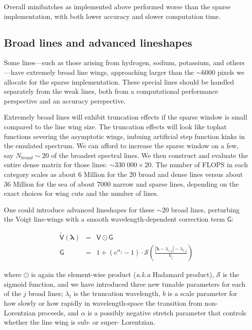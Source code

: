 \documentclass[twocolumn]{aastex631}
\begin{document}
Overall minibatches as implemented above performed worse than the sparse implementation, with both lower accuracy and slower computation time.

\subsection{Broad lines and advanced lineshapes}

Some lines---such as those arising from hydrogen, sodium, potassium, and others---have extremely broad line wings, approaching larger than the $\sim6000$ pixels we allocate for the sparse implementation. These special lines should be handled separately from the weak lines, both from a computational performance perspective and an accuracy perspective.

Extremely broad lines will exhibit truncation effects if the sparse window is small compared to the line wing size. The truncation effects will look like tophat functions severing the asymptotic wings, imbuing artificial step function kinks in the emulated spectrum. We can afford to increase the sparse window on a few, say $N_{broad}\sim20$ of the broadest spectral lines. We then construct and evaluate the entire dense matrix for those lines: $\sim 330\;000 \times 20$. The number of FLOPS in each category scales as about 6 Million for the 20 broad and dense lines versus about 36 Million for the sea of about 7000 narrow and sparse lines, depending on the exact choices for wing cuts and the number of lines.

One could introduce advanced lineshapes for these $\sim20$ broad lines, perturbing the Voigt line-wings with a smooth wavelength-dependent correction term $\mathsf{G}$:

\begin{eqnarray}
    \mathsf{\tilde{V}(\bm{\lambda})} &=& \mathsf{V} \odot \mathsf{G}\\
    \mathsf{G} &=& 1 + (e^{\alpha_j} - 1) \cdot \mathcal{S}\left(\frac{|\bm{\lambda}-\lambda_{c,j}| - \lambda_{t, j}}{b_j}\right)
\end{eqnarray}

where $\odot$ is again the element-wise product (\emph{a.k.a} Hadamard product), $\mathcal{S}$ is the sigmoid function, and we have introduced three new tunable parameters for each of the $j$ broad lines; $\lambda_t$ is the truncation wavelength, $b$ is a scale parameter for how slowly or how rapidly in wavelength-space the transition from non-Lorentzian proceeds, and $\alpha$ is a possibly negative stretch parameter that controls whether the line wing is sub- or super- Lorentzian.
\end{document}
